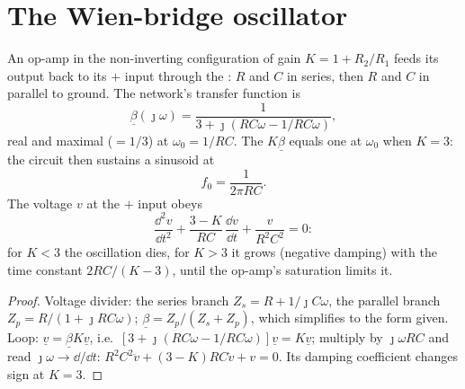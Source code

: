 \section{The Wien-bridge oscillator}

\begin{proposition}\label{prop:b2:feedback-oscillators:wien}
An op-amp in the non-inverting configuration of gain $K = 1 + R_2/R_1$
feeds its output back to its $+$ input through the \emph{}:
$R$ and $C$ in series, then $R$ and $C$ in parallel to ground. The
network's transfer function is
\[
\underline\beta(\jmath\omega) = \frac1{3 + \jmath(RC\omega - 1/RC\omega)} ,
\]
real and maximal ($= 1/3$) at $\omega_0 = 1/RC$. The  $K\underline\beta$
equals one at $\omega_0$ when $K = 3$: the circuit then sustains a
sinusoid at
\[
f_0 = \frac1{2\pi RC} .
\]
The voltage $v$ at the $+$ input obeys
\[
\frac{\dd^2v}{\dd t^2} + \frac{3 - K}{RC}\,\frac{\dd v}{\dd t} + \frac{v}{R^2C^2} = 0 :
\]
for $K < 3$ the oscillation dies, for $K > 3$ it grows (negative
damping) with the time constant $2RC/(K - 3)$, until the op-amp's
saturation limits it.
\end{proposition}

\begin{proof}
Voltage divider: the series branch $Z_s = R + 1/\jmath C\omega$, the parallel
branch $Z_p = R/(1 + \jmath RC\omega)$; $\underline\beta = Z_p/(Z_s + Z_p)$, which
simplifies to the form given. Loop: $\underline v = \underline\beta K\underline v$, i.e.\
$[3 + \jmath(RC\omega - 1/RC\omega)]\underline v = K\underline v$; multiply by $\jmath\omega RC$
and read $\jmath\omega \to \dd/\dd t$: $R^2C^2\ddot v + (3 - K)RC\dot v + v = 0$.
Its damping coefficient changes sign at $K = 3$.
\end{proof}

